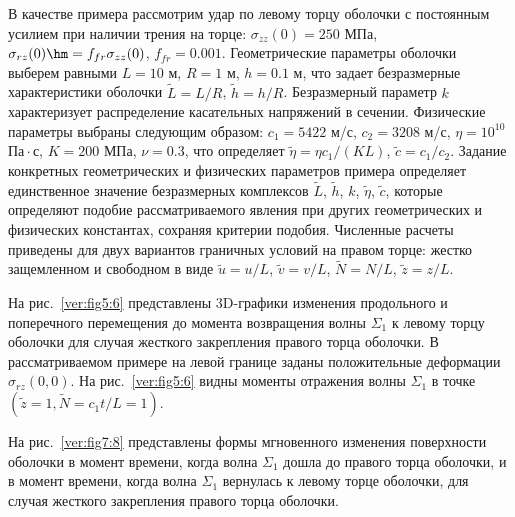 В качестве примера рассмотрим удар по левому торцу оболочки с постоянным усилием при наличии трения на торце: $\sigma_{zz}(0)=250$ МПа, 
$\sigma_{rz}(0)\hm =f_{fr}\sigma_{zz}(0)$, 
$f_{fr}=0.001$. 
Геометрические параметры оболочки выберем равными $L=10$ м, $R=1$ м, $h=0.1$ м, что задает безразмерные характеристики оболочки $\tilde L={L}/{R}$, $\tilde h={h}/{R}$. 
Безразмерный параметр $k$ характеризует распределение касательных напряжений в сечении. Физические параметры выбраны следующим образом: $c_1=5422$ м/с, $c_2=3208$ м/с, $\eta=10^{10}$ Па${}\cdot{}$с, $K=200$ МПа, $\nu=0.3$, 
что определяет $\tilde \eta={\eta c_1}/({K L})$, $\tilde c=c_1/c_2$. Задание конкретных геометрических и физических параметров примера определяет единственное значение безразмерных комплексов $\tilde L$, $\tilde h$, $k$, $\tilde \eta$, $\tilde c$, которые определяют подобие рассматриваемого явления при других геометрических и физических константах, сохраняя критерии подобия.
Численные расчеты приведены для двух вариантов граничных условий на правом торце: жестко защемленном и свободном в виде $\tilde u=u/L$, $\tilde v=v/L$, $\tilde N=N/L$, $\tilde z=z/L$.

На рис.~\ref{ver:fig5:6} представлены 3D-графики изменения продольного и поперечного перемещения до момента возвращения волны $\Sigma_1$ к левому торцу оболочки для случая жесткого закрепления правого торца оболочки. В рассматриваемом примере на левой границе заданы положительные деформации $\sigma_{rz}(0,0)$.
На рис.~\ref{ver:fig5:6} видны моменты отражения волны $\Sigma_1$ в точке $(\tilde z=1, {\tilde N =c_1 t/L=1})$.



На рис.~\ref{ver:fig7:8} представлены формы мгновенного изменения поверхности оболочки в момент времени, когда волна $\Sigma_1$ дошла до правого торца оболочки, и в момент времени, когда волна $\Sigma_1$ вернулась к левому торце оболочки, для случая жесткого закрепления правого торца оболочки.

